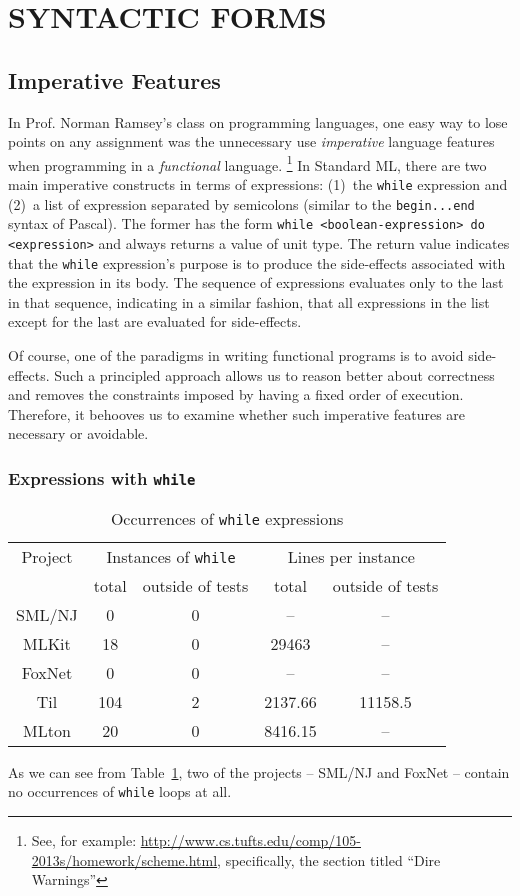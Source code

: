\documentclass[12pt,abstracton]{scrartcl}
\begin{document}
\section{SYNTACTIC FORMS}\label{sec:syntax}
\subsection{Imperative Features}\label{subsec:imper}
In Prof. Norman Ramsey's class on programming languages, one easy way to lose points
on any assignment was the unnecessary use \emph{imperative} language features when programming in a \emph{functional} language.
\footnote{See, for example: \url{http://www.cs.tufts.edu/comp/105-2013s/homework/scheme.html}, specifically, the section titled ``Dire Warnings''}
In Standard ML, there are two main imperative constructs in terms of expressions:
(1)~the \texttt{while} expression and (2)~a list of expression separated by semicolons (similar to the \texttt{begin...end} syntax of Pascal)\cite{Ull98}.
The former has the form \texttt{while <boolean-expression> do <expression>} and always returns a value of unit type.
The return value indicates that the \texttt{while} expression's purpose is to produce the side-effects associated
with the expression in its body. The sequence of expressions evaluates only to the last in that sequence, indicating
in a similar fashion, that all expressions in the list except for the last are evaluated for side-effects.

Of course, one of the paradigms in writing functional programs is to avoid side-effects.
Such a principled approach allows us to reason better about correctness and
removes the constraints imposed by having a fixed order of execution.\cite{Hug90} Therefore,
it behooves us to examine whether such imperative features are necessary or avoidable.
\subsubsection{Expressions with \texttt{while}}
\begin{table}[h!]
\centering
\begin{tabular}{|c||c|c||c|c|}
\hline
Project & \multicolumn{2}{c||}{Instances of \texttt{while}} & \multicolumn{2}{c|}{Lines per instance} \\ \cline{2-3}\cline{4-5}
 & total & outside of tests & total & outside of tests \\ \hline\hline
SML/NJ & 0 & 0 & -- & --\\ 
MLKit & 18 & 0 & 29463 & --\\
FoxNet & 0 & 0 & -- & -- \\
Til & 104 & 2 & 2137.66 & 11158.5 \\
MLton & 20 & 0 & 8416.15 & --\\ \hline
\end{tabular}
\caption{Occurrences of \texttt{while} expressions}
\label{table:while}
\end{table}
As we can see from Table~\ref{table:while}, two of the projects -- SML/NJ and FoxNet -- contain no occurrences
of \texttt{while} loops at all.
\end{document}
